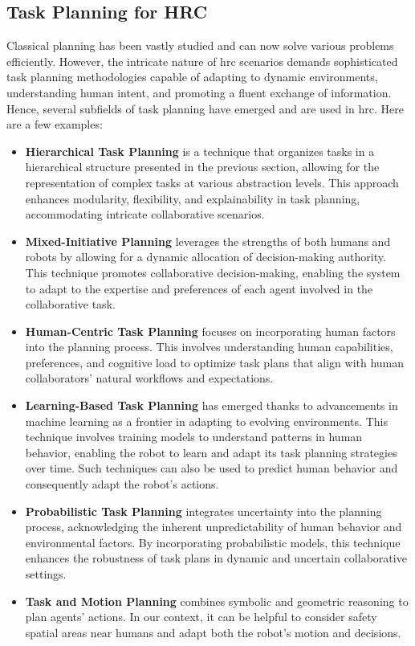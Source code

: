\subsection{Task Planning for HRC}

Classical planning has been vastly studied and can now solve various problems efficiently. However, the intricate nature of \acrshort{hrc} scenarios demands sophisticated task planning methodologies capable of adapting to dynamic environments, understanding human intent, and promoting a fluent exchange of information. Hence, several subfields of task planning have emerged and are used in \acrshort{hrc}. Here are a few examples:

\begin{itemize}
    \item \textbf{Hierarchical Task Planning} is a technique that organizes tasks in a hierarchical structure presented in the previous section, allowing for the representation of complex tasks at various abstraction levels. This approach enhances modularity, flexibility, and explainability in task planning, accommodating intricate collaborative scenarios.
    
    \item \textbf{Mixed-Initiative Planning} leverages the strengths of both humans and robots by allowing for a dynamic allocation of decision-making authority. This technique promotes collaborative decision-making, enabling the system to adapt to the expertise and preferences of each agent involved in the collaborative task.
    
    \item \textbf{Human-Centric Task Planning} focuses on incorporating human factors into the planning process. This involves understanding human capabilities, preferences, and cognitive load to optimize task plans that align with human collaborators' natural workflows and expectations.
    
    \item \textbf{Learning-Based Task Planning} has emerged thanks to advancements in machine learning as a frontier in adapting to evolving environments. This technique involves training models to understand patterns in human behavior, enabling the robot to learn and adapt its task planning strategies over time. Such techniques can also be used to predict human behavior and consequently adapt the robot's actions.
    
    \item \textbf{Probabilistic Task Planning} integrates uncertainty into the planning process, acknowledging the inherent unpredictability of human behavior and environmental factors. By incorporating probabilistic models, this technique enhances the robustness of task plans in dynamic and uncertain collaborative settings.
    
    \item \textbf{Task and Motion Planning} combines symbolic and geometric reasoning to plan agents' actions. In our context, it can be helpful to consider safety spatial areas near humans and adapt both the robot's motion and decisions. 
    
\end{itemize}

